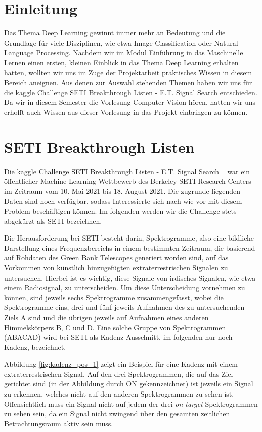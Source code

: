 \documentclass[12pt, a4paper]{article}
\begin{document}
\tableofcontents
\thispagestyle{empty}
\newpage

\section{Einleitung}
\onehalfspacing
Das Thema Deep Learning gewinnt immer mehr an Bedeutung und die Grundlage für viele Disziplinen, wie etwa Image Classification oder Natural Language Processing. Nachdem wir im Modul Einführung in das Maschinelle Lernen einen ersten, kleinen Einblick in das Thema Deep Learning erhalten hatten, wollten wir uns im Zuge der Projektarbeit praktisches Wissen in diesem Bereich aneignen. Aus denen zur Auswahl stehenden Themen haben wir uns für die kaggle Challenge SETI Breakthrough Listen - E.T. Signal Search entschieden. Da wir in diesem Semester die Vorlesung Computer Vision hören, hatten wir uns erhofft auch Wissen aus dieser Vorlesung in das Projekt einbringen zu können. 

\section{SETI Breakthrough Listen}
Die kaggle Challenge SETI Breakthrough Listen - E.T. Signal Search ~\cite{o4} war ein öffentlicher Machine Learning Wettbewerb des Berkeley SETI Research Centers im Zeitraum vom 10. Mai 2021 bis 18. August 2021. Die zugrunde liegenden Daten sind noch verfügbar, sodass Interessierte sich nach wie vor mit diesem Problem beschäftigen können. Im folgenden werden wir die Challenge stets abgekürzt als SETI bezeichnen. 

Die Herausforderung bei SETI besteht darin, Spektrogramme, also eine bildliche Darstellung eines Frequenzbereichs in einem bestimmten Zeitraum, die basierend auf Rohdaten des Green Bank Telescopes generiert worden sind, auf das Vorkommen von künstlich hinzugefügten extraterrestrischen Signalen zu untersuchen. Hierbei ist es wichtig, diese Signale von irdisches Signalen, wie etwa einem Radiosignal, zu unterscheiden. Um diese Unterscheidung vornehmen zu können, sind jeweils sechs Spektrogramme zusammengefasst, wobei die Spektrogramme eins, drei und fünf jeweils Aufnahmen des zu untersuchenden Ziels \glqq A\grqq{} sind und die übrigen jeweils auf Aufnahmen eines anderen Himmelskörpers \glqq B\grqq{}, \glqq C\grqq{} und \glqq D\grqq{}. Eine solche Gruppe von Spektrogrammen (ABACAD) wird bei SETI als Kadenz-Ausschnitt, im folgenden nur noch \glqq Kadenz\grqq{}, bezeichnet.

Abbildung \ref{fig:kadenz_pos_1} zeigt ein Beispiel für eine Kadenz mit einem extraterrestrischen Signal. Auf den drei Spektrogrammen, die auf das Ziel gerichtet sind (in der Abbildung durch \glqq ON\grqq{} gekennzeichnet) ist jeweils ein Signal zu erkennen, welches nicht auf den anderen Spektrogrammen zu sehen ist. Offensichtlich muss ein Signal nicht auf jedem der drei \emph{on target} Spektrogrammen zu sehen sein, da ein Signal nicht zwingend über den gesamten zeitlichen Betrachtungsraum aktiv sein muss.
\end{document}
